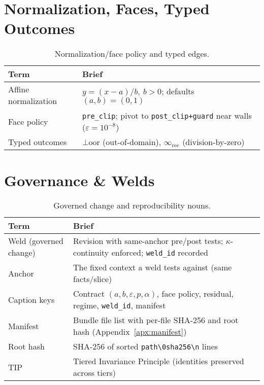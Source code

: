 \section{Normalization, Faces, Typed Outcomes}
\label{sec:glossary-faces}
\begin{table}[H]
  \centering
  \caption{Normalization/face policy and typed edges.}
  \label{tab:glossary-faces}
  \footnotesize
  \begingroup\setlength{\tabcolsep}{6pt}
  \begin{tabularx}{\linewidth}{@{} l >{\raggedright\arraybackslash}X @{}}
    \toprule
    Term & Brief \\
    \midrule
    Affine normalization & $y=(x-a)/b,\ b>0$; defaults $(a,b)=(0,1)$ \\
    Face policy          & \texttt{pre\_clip}; pivot to \texttt{post\_clip+guard} near walls ($\varepsilon=10^{-8}$) \\
    Typed outcomes       & $\bot\!\mathrm{oor}$ (out-of-domain), $\infty_{\mathrm{rec}}$ (division-by-zero) \\
    \bottomrule
  \end{tabularx}
  \endgroup
\end{table}

\section{Governance \& Welds}
\label{sec:glossary-weld}
\begin{table}[h]
  \centering
  \caption{Governed change and reproducibility nouns.}
  \label{tab:glossary-weld}
  \footnotesize
  \begingroup\setlength{\tabcolsep}{6pt}
  \begin{tabularx}{\linewidth}{@{} l >{\raggedright\arraybackslash}X @{}}
    \toprule
    Term & Brief \\
    \midrule
    Weld (governed change) & Revision with same-anchor pre/post tests; $\kappa$-continuity enforced; \texttt{weld\_id} recorded \\
    Anchor                  & The fixed context a weld tests against (same facts/slice) \\
    Caption keys            & Contract $(a,b,\varepsilon,p,\alpha)$, face policy, residual, regime, \texttt{weld\_id}, manifest \\
    Manifest                & Bundle file list with per-file SHA-256 and root hash (Appendix~\ref{apx:manifest}) \\
    Root hash               & SHA-256 of sorted \verb|path\0sha256\n| lines \\
    TIP                     & Tiered Invariance Principle (identities preserved across tiers) \\
    \bottomrule
  \end{tabularx}
  \endgroup
\end{table}

